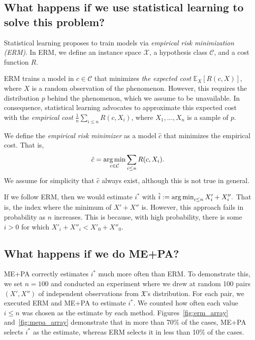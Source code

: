\subsection{What happens if we use statistical learning to solve this problem?}

Statistical learning proposes to train models via \emph{empirical risk minimization (ERM)}. In ERM, we define an instance space $\mathcal{X}$, a hypothesis class $\mathcal{C}$, and a cost function $R$. 

ERM trains a model in $c \in \mathcal{C}$ that minimizes \emph{the expected cost} $\mathbb{E}_X[R(c, X)]$, where $X$ is a random observation of the phenomenon. However, this requires the distribution $p$ behind the phenomenon, which we assume to be unavailable. In consequence, statistical learning advocates to approximate this expected cost with the \emph{empirical cost} $\frac{1}{n} \sum_{i \leq n} R(c, X_i)$, where $X_1, \ldots, X_n$ is a sample of $p$.

We define the \emph{empirical risk minimizer} as a model $\hat{c}$ that minimizes the empirical cost. That is,
%
\begin{equation}
\hat{c} = \operatorname*{arg\,min}_{c \in \mathcal{C}} \sum_{i \leq n} R(c, X_i).
\end{equation}
%
We assume for simplicity that $\hat{c}$ always exist, although this is not true in general.

If we follow ERM, then we would estimate $i^*$ with $\hat{i} := \operatorname*{arg\,min}_{i \leq n} X'_i + X''_i.$
That is, the index where the minimum of $X' + X''$ is. However, this approach fails in probability as $n$ increases. This is because, with high probability, there is some $i > 0$ for which $X'_i + X''_i < X'_0 + X''_0$.

\subsection{What happens if we do ME+PA?}

ME+PA correctly estimates $i^*$ much more often than ERM. To demonstrate this, we set $n = 100$ and conducted an experiment where we drew at random 100 pairs $(X', X'')$ of independent observations from $\mathfrak{X}$'s distribution. For each pair, we executed ERM and ME+PA to estimate $i^*$. We counted how often each value $i \leq n$ was chosen as the estimate by each method. Figures~\ref{fig:erm_array} and~\ref{fig:mepa_array} demonstrate that in more than 70\% of the cases, ME+PA selects $i^*$ as the estimate, whereas ERM selects it in less than 10\% of the cases.

